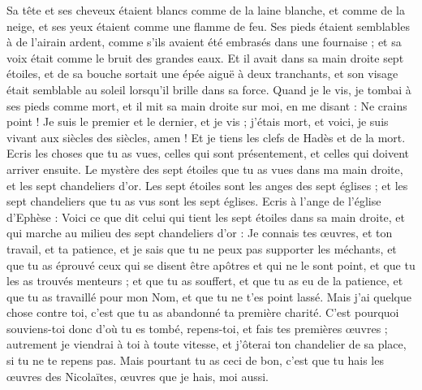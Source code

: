 \begin{multicols}{2}
Sa tête et ses cheveux étaient blancs comme de la laine blanche, et comme de la neige, et ses yeux étaient comme une flamme de feu.
Ses pieds étaient semblables à de l'airain ardent, comme s'ils avaient été embrasés dans une fournaise ; et sa voix était comme le bruit des grandes eaux.
Et il avait dans sa main droite sept étoiles, et de sa bouche sortait une épée aiguë à deux tranchants, et son visage était semblable au soleil lorsqu'il brille dans sa force.
Quand je le vis, je tombai à ses pieds comme mort, et il mit sa main droite sur moi, en me disant : Ne crains point !
Je suis le premier et le dernier, et je vis ; j'étais mort, et voici, je suis vivant aux siècles des siècles, amen ! Et je tiens les clefs de Hadès et de la mort.
Ecris les choses que tu as vues, celles qui sont présentement, et celles qui doivent arriver ensuite.
Le mystère des sept étoiles que tu as vues dans ma main droite, et les sept chandeliers d'or. Les sept étoiles sont les anges des sept églises ; et les sept chandeliers que tu as vus sont les sept églises.
\VerseOne{}Ecris à l'ange de l'église d'Ephèse : Voici ce que dit celui qui tient les sept étoiles dans sa main droite, et qui marche au milieu des sept chandeliers d'or :
Je connais tes œuvres, et ton travail, et ta patience, et je sais que tu ne peux pas supporter les méchants, et que tu as éprouvé ceux qui se disent être apôtres et qui ne le sont point, et que tu les as trouvés menteurs ;
et que tu as souffert, et que tu as eu de la patience, et que tu as travaillé pour mon Nom, et que tu ne t'es point lassé.
Mais j'ai quelque chose contre toi, c'est que tu as abandonné ta première charité.
C'est pourquoi souviens-toi donc d'où tu es tombé, repens-toi, et fais tes premières œuvres ; autrement je viendrai à toi à toute vitesse, et j'ôterai ton chandelier de sa place, si tu ne te repens pas.
Mais pourtant tu as ceci de bon, c'est que tu hais les œuvres des Nicolaïtes, œuvres que je hais, moi aussi.

\end{multicols}
